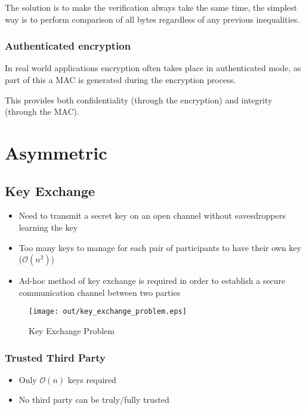 \documentclass[a4paper]{article}
\begin{document}
The solution is to make the verification always take the same time, the simplest
way is to perform comparison of all bytes regardless of any previous
inequalities.

\subsubsection{Authenticated encryption}

In real world applications encryption often takes place in authenticated mode,
as part of this a MAC is generated during the encryption process.

This provides both confidentiality (through the encryption) and integrity
(through the MAC).

\section{Asymmetric}

\subsection{Key Exchange}

\begin{itemize}
  \item Need to transmit a secret key on an open channel without eavesdroppers
        learning the key
  \item Too many keys to manage for each pair of participants to have their own
        key ($\mathcal{O}(n^{2})$)
  \item Ad-hoc method of key exchange is required in order to establish a secure
        communication channel between two parties
\end{itemize}

\begin{figure}[h!]
  \centering
  \texttt{[image: out/key\_exchange\_problem.eps]}
  \caption{Key Exchange Problem}
  \label{fig:key_exchange_problem}
\end{figure}
\FloatBarrier

\subsubsection{Trusted Third Party}

\begin{itemize}
  \item Only $\mathcal{O}(n)$ keys required
  \item No third party can be truly/fully trusted
\end{itemize}
\end{document}
